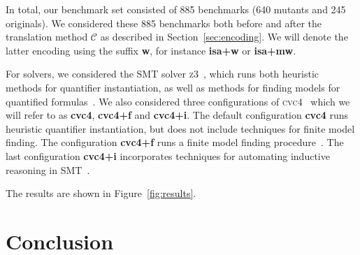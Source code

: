 \documentclass[runningheads,a4paper]{llncs}
\newcommand{\cvc}{\textsc{cvc}{\small 4}\xspace}
\newcommand{\ziii}{\textsc{z}{\small 3}\xspace}
\newcommand{\conv}{\mathcal{C}}
\begin{document}
In total, our benchmark set consisted of 885 benchmarks (640 mutants and 245 originals).
We considered these 885 benchmarks both before and after the translation method $\conv$ as described in Section~\ref{sec:encoding}.
We will denote the latter encoding using the suffix {\bf w}, for instance {\bf isa+w} or {\bf isa+mw}.

For solvers, we considered the SMT solver \ziii~\cite{de-moura-bjoerner-2008}, 
which runs both heuristic methods for quantifier instantiation,
as well as methods for finding models for quantified formulas~\cite{GeDeM-CAV-09}.
We also considered three configurations of \cvc~\cite{barrett-et-al-2011} which we will refer to as {\bf cvc4}, {\bf cvc4+f} and {\bf cvc4+i}.
The default configuration {\bf cvc4} runs heuristic quantifier instantiation, but does not include techniques for finite model finding.
The configuration {\bf cvc4+f} runs a finite model finding procedure~\cite{ReyEtAl-1-RR-13}.
The last configuration {\bf cvc4+i} incorporates techniques for automating inductive reasoning in SMT~\cite{reynolds-kuncak-2015}.


The results are shown in Figure~\ref{fig:results}.


\section{Conclusion}
\label{sec:conclusion}

{


}
\end{document}
